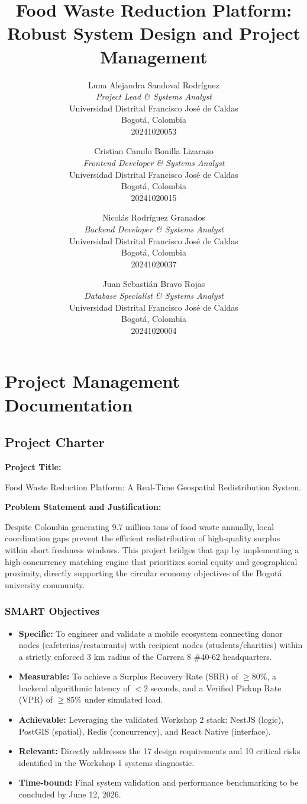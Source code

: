 \documentclass[9pt,conference]{IEEEtran}
\title{Food Waste Reduction Platform: Robust System Design and Project Management}
\author{
Luna Alejandra Sandoval Rodríguez \\
\textit{Project Lead \& Systems Analyst} \\
Universidad Distrital Francisco José de Caldas \\
Bogotá, Colombia \\
20241020053
\and
Cristian Camilo Bonilla Lizarazo \\
\textit{Frontend Developer \& Systems Analyst} \\
Universidad Distrital Francisco José de Caldas \\
Bogotá, Colombia \\
20241020015
\and
Nicolás Rodríguez Granados \\
\textit{Backend Developer \& Systems Analyst} \\
Universidad Distrital Francisco José de Caldas \\
Bogotá, Colombia \\
20241020037
\and
Juan Sebastián Bravo Rojas \\
\textit{Database Specialist \& Systems Analyst} \\
Universidad Distrital Francisco José de Caldas \\
Bogotá, Colombia \\
20241020004
}
\begin{document}
\maketitle

\section{Project Management Documentation}

\subsection{Project Charter}

\textbf{Project Title:}

Food Waste Reduction Platform: A Real-Time Geospatial Redistribution System.

\textbf{Problem Statement and Justification:}

Despite Colombia generating 9.7 million tons of food waste annually, local coordination gaps prevent the efficient redistribution of high-quality surplus within short freshness windows. This project bridges that gap by implementing a high-concurrency matching engine that prioritizes social equity and geographical proximity, directly supporting the circular economy objectives of the Bogotá university community.


\subsubsection{SMART Objectives}
\begin{itemize}
    \item \textbf{Specific:} To engineer and validate a mobile ecosystem connecting donor nodes (cafeterias/restaurants) with recipient nodes (students/charities) within a strictly enforced 3 km radius of the Carrera 8 \#40-62 headquarters.
    \item \textbf{Measurable:} To achieve a Surplus Recovery Rate (SRR) of $\ge 80\%$, a backend algorithmic latency of $< 2$ seconds, and a Verified Pickup Rate (VPR) of $\ge 85\%$ under simulated load.
    \item \textbf{Achievable:} Leveraging the validated Workshop 2 stack: NestJS (logic), PostGIS (spatial), Redis (concurrency), and React Native (interface).
    \item \textbf{Relevant:} Directly addresses the 17 design requirements and 10 critical risks identified in the Workshop 1 systems diagnostic.
    \item \textbf{Time-bound:} Final system validation and performance benchmarking to be concluded by June 12, 2026.
\end{itemize}
\end{document}
